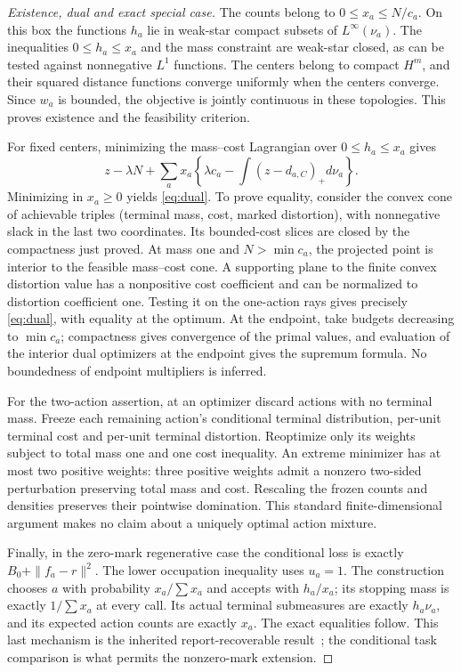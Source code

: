 \begin{proof}[Existence, dual and exact special case]
The counts belong to $0\le x_a\le N/c_a$. On this box the functions $h_a$ lie in weak-star compact subsets of $L^\infty(\nu_a)$. The inequalities $0\le h_a\le x_a$ and the mass constraint are weak-star closed, as can be tested against nonnegative $L^1$ functions. The centers belong to compact $H^m$, and their squared distance functions converge uniformly when the centers converge. Since $w_a$ is bounded, the objective is jointly continuous in these topologies. This proves existence and the feasibility criterion.

For fixed centers, minimizing the mass--cost Lagrangian over $0\le h_a\le x_a$ gives
\[
 z-\lambda N+\sum_ax_a\left\{\lambda c_a-\int(z-d_{a,C})_+d\nu_a\right\}.
\]
Minimizing in $x_a\ge0$ yields \eqref{eq:dual}. To prove equality, consider the convex cone of achievable triples (terminal mass, cost, marked distortion), with nonnegative slack in the last two coordinates. Its bounded-cost slices are closed by the compactness just proved. At mass one and $N>\min c_a$, the projected point is interior to the feasible mass--cost cone. A supporting plane to the finite convex distortion value has a nonpositive cost coefficient and can be normalized to distortion coefficient one. Testing it on the one-action rays gives precisely \eqref{eq:dual}, with equality at the optimum. At the endpoint, take budgets decreasing to $\min c_a$; compactness gives convergence of the primal values, and evaluation of the interior dual optimizers at the endpoint gives the supremum formula. No boundedness of endpoint multipliers is inferred.

For the two-action assertion, at an optimizer discard actions with no terminal mass. Freeze each remaining action's conditional terminal distribution, per-unit terminal cost and per-unit terminal distortion. Reoptimize only its weights subject to total mass one and one cost inequality. An extreme minimizer has at most two positive weights: three positive weights admit a nonzero two-sided perturbation preserving total mass and cost. Rescaling the frozen counts and densities preserves their pointwise domination. This standard finite-dimensional argument makes no claim about a uniquely optimal action mixture.

Finally, in the zero-mark regenerative case the conditional loss is exactly $B_0+\|f_a-r\|^2$. The lower occupation inequality uses $u_a=1$. The construction chooses $a$ with probability $x_a/\sum x_a$ and accepts with $h_a/x_a$; its stopping mass is exactly $1/\sum x_a$ at every call. Its actual terminal submeasures are exactly $h_a\nu_a$, and its expected action counts are exactly $x_a$. The exact equalities follow. This last mechanism is the inherited report-recoverable result~\cite{GTF51}; the conditional task comparison is what permits the nonzero-mark extension.
\end{proof}
